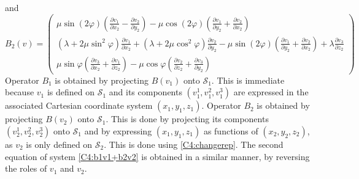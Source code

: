 and
\begin{equation}
B_2(v)=
\begin{pmatrix}
\mu \sin(2\varphi)\left( \frac{\partial v_1}{\partial x_2}-\frac{\partial v_2}{\partial y_2}\right)-\mu \cos(2\varphi)  \left( \frac{\partial v_1}{\partial y_2}+\frac{\partial v_2}{\partial x_2} \right)\\
(\lambda+2\mu \sin^2\varphi) \frac{\partial v_1}{\partial x_2}+(\lambda+2\mu \cos^2 \varphi)\frac{\partial v_2}{\partial y_2}-\mu \sin(2\varphi)  \left( \frac{\partial v_1}{\partial y_2}+\frac{\partial v_2}{\partial x_2} \right)+\lambda \frac{\partial v_3}{\partial z_2} \\
\mu\sin\varphi\left(\frac{\partial v_3}{\partial x_2}+\frac{\partial v_1}{\partial z_2} \right)-\mu\cos\varphi\left( \frac{\partial v_2}{\partial z_2} +\frac{\partial v_3}{\partial y_2} \right)
\end{pmatrix}
\label{C4:B2v2expl}
\end{equation}
Operator $B_1$ is obtained by projecting $B(v_1)$ onto $\mathcal{S}_1$. This is immediate because $v_1$ is defined on $\mathcal{S}_1$ and its components $(v_1^1,v_1^2,v_1^3)$ are expressed in the associated Cartesian coordinate system $(x_1,y_1,z_1)$. Operator $B_2$ is obtained by projecting $B(v_2)$ onto $\mathcal{S}_1$. This is done by projecting its components $(v_2^1,v_2^2,v_2^3)$ onto $\mathcal{S}_1$ and by expressing $(x_1,y_1,z_1)$ as functions of $(x_2,y_2,z_2)$, as $v_2$ is only defined on $\mathcal{S}_2$. This is done using \eqref{C4:changerep}. The second equation of system \eqref{C4:b1v1+b2v2} is obtained in a similar manner, by reversing the roles of $v_1$ and $v_2$.

